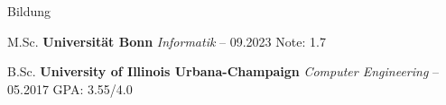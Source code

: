 \begin{rubric}{Bildung}


\entry*[] M.Sc. \textbf{Universität Bonn} \hfill  \emph{Informatik}    -- 09.2023 \hfill Note:  1.7 %

\entry*[] B.Sc. \textbf{University of Illinois Urbana-Champaign} \hfill  \emph{Computer Engineering}  -- 05.2017 \hfill GPA: 3.55/4.0 \newline %



\end{rubric}